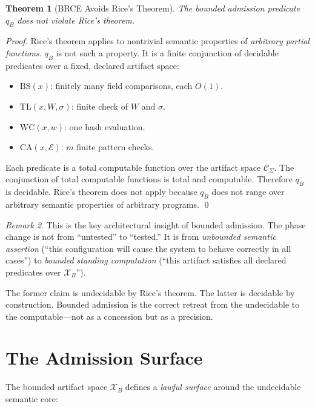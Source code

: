 \documentclass[12pt, letterpaper]{report}
\theoremstyle{plain}
\newtheorem{theorem}{Theorem}[chapter]
\theoremstyle{definition}
\theoremstyle{remark}
\newtheorem{remark}[theorem]{Remark}
\newcommand{\CC}{\mathcal{C}}
\newcommand{\EE}{\mathcal{E}}
\begin{document}
\begin{theorem}[BRCE Avoids Rice's Theorem]
\label{thm:rice-avoid}
The bounded admission predicate $q_B$ does not violate Rice's theorem.
\end{theorem}

\begin{proof}
Rice's theorem applies to nontrivial semantic properties of
\emph{arbitrary partial functions}. $q_B$ is not such a property.
It is a finite conjunction of decidable predicates over a fixed, declared
artifact space:
\begin{itemize}
  \item $\mathrm{BS}(x)$: finitely many field comparisons, each $O(1)$.
  \item $\mathrm{TL}(x, W, \sigma)$: finite check of $W$ and $\sigma$.
  \item $\mathrm{WC}(x, w)$: one hash evaluation.
  \item $\mathrm{CA}(x, \EE)$: $m$ finite pattern checks.
\end{itemize}
Each predicate is a total computable function over the artifact space
$\CC_\Sigma$. The conjunction of total computable functions is total
and computable. Therefore $q_B$ is decidable.
Rice's theorem does not apply because $q_B$ does not range over arbitrary
semantic properties of arbitrary programs. \qed
\end{proof}

\begin{remark}
This is the key architectural insight of bounded admission.
The phase change is not from ``untested'' to ``tested.''
It is from \emph{unbounded semantic assertion}
(``this configuration will cause the system to behave correctly in all cases'')
to \emph{bounded standing computation}
(``this artifact satisfies all declared predicates over $\mathcal{X}_B$'').

The former claim is undecidable by Rice's theorem.
The latter is decidable by construction.
Bounded admission is the correct retreat from the undecidable to the
computable---not as a concession but as a precision.
\end{remark}

\section{The Admission Surface}

The bounded artifact space $\mathcal{X}_B$ defines a \emph{lawful surface}
around the undecidable semantic core:
\end{document}
